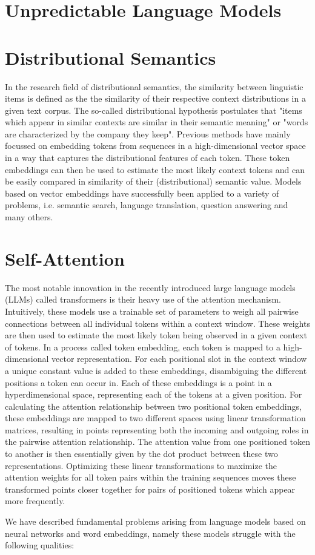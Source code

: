 \section{Unpredictable Language Models}

\section{Distributional Semantics}

In the research field of distributional semantics, the similarity between linguistic 
items is defined as the the similarity of their respective context distributions in a 
given text corpus. The so-called distributional hypothesis postulates that "items which 
appear in similar contexts are similar in their semantic meaning" or "words are 
characterized by the company they keep".
Previous methods have mainly focussed on embedding tokens from sequences in a 
high-dimensional vector space in a way that captures the distributional features of each 
token. These token embeddings can then be used to estimate the most likely context tokens 
and can be easily compared in similarity of their (distributional) semantic value.
Models based on vector embeddings have successfully been applied to a variety of 
problems, i.e. semantic search, language translation, question answering and many others.

\section{Self-Attention}
The most notable innovation in the recently introduced large language models (LLMs) called transformers is their heavy use of the attention mechanism. Intuitively, these models use a trainable set of parameters to weigh all pairwise connections between all individual tokens within a context window. These weights are then used to estimate the most likely token being observed in a given context of tokens.
In a process called token embedding, each token is mapped to a high-dimensional vector representation. For each positional slot in the context window a unique constant value is added to these embeddings, disambiguing the different positions a token can occur in.
Each of these embeddings is a point in a hyperdimensional space, representing each of the tokens at a given position.
For calculating the attention relationship between two positional token embeddings, these embeddings are mapped to two different spaces using linear transformation matrices, resulting in points representing both the incoming and outgoing roles in the pairwise attention relationship. The attention value from one positioned token to another is then essentially given by the dot product between these two representations.
Optimizing these linear transformations to maximize the attention weights for all token pairs within the training sequences moves these transformed points closer together for pairs of positioned tokens which appear more frequently.

We have described fundamental problems arising from language models based on neural networks and word embeddings, namely these models struggle with the following qualities:



